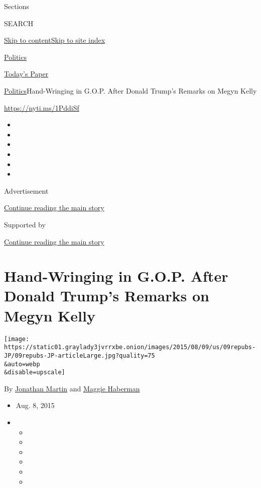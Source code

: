 Sections

SEARCH

\protect\hyperlink{site-content}{Skip to
content}\protect\hyperlink{site-index}{Skip to site index}

\href{https://www.nytimes3xbfgragh.onion/section/politics}{Politics}

\href{https://myaccount.nytimes3xbfgragh.onion/auth/login?response_type=cookie\&client_id=vi}{}

\href{https://www.nytimes3xbfgragh.onion/section/todayspaper}{Today's
Paper}

\href{/section/politics}{Politics}\textbar{}Hand-Wringing in G.O.P.
After Donald Trump's Remarks on Megyn Kelly

\url{https://nyti.ms/1PddiSf}

\begin{itemize}
\item
\item
\item
\item
\item
\item
\end{itemize}

Advertisement

\protect\hyperlink{after-top}{Continue reading the main story}

Supported by

\protect\hyperlink{after-sponsor}{Continue reading the main story}

\hypertarget{hand-wringing-in-gop-after-donald-trumps-remarks-on-megyn-kelly}{%
\section{Hand-Wringing in G.O.P. After Donald Trump's Remarks on Megyn
Kelly}\label{hand-wringing-in-gop-after-donald-trumps-remarks-on-megyn-kelly}}

\texttt{[image: https://static01.graylady3jvrrxbe.onion/images/2015/08/09/us/09repubs-JP/09repubs-JP-articleLarge.jpg?quality=75\\\&auto=webp\\\&disable=upscale]}

By \href{http://www.nytimes3xbfgragh.onion/by/jonathan-martin}{Jonathan
Martin} and
\href{http://www.nytimes3xbfgragh.onion/by/maggie-haberman}{Maggie
Haberman}

\begin{itemize}
\item
  Aug. 8, 2015
\item
  \begin{itemize}
  \item
  \item
  \item
  \item
  \item
  \item
  \end{itemize}
\end{itemize}

